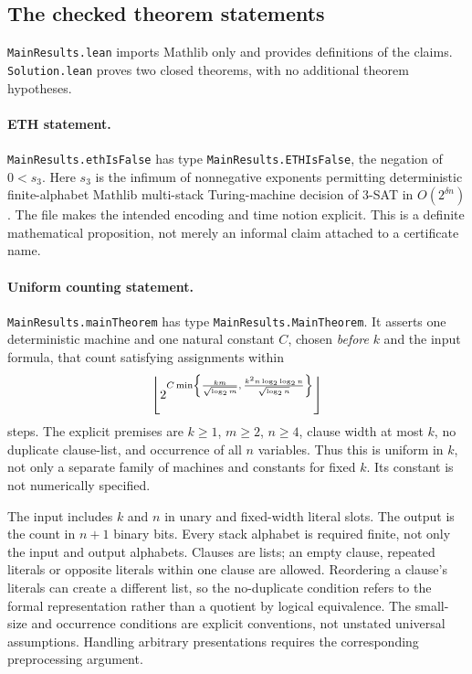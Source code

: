 \documentclass[11pt,letterpaper]{article}
\theoremstyle{remark}\newtheorem{remark}[theorem]{Remark}
\begin{document}
\subsection{The checked theorem statements}
\texttt{MainResults.lean} imports Mathlib only and provides definitions of the claims. \texttt{Solution.lean} proves two closed theorems, with no additional theorem hypotheses.

\paragraph{ETH statement.}
\texttt{MainResults.ethIsFalse} has type \texttt{MainResults.ETHIsFalse}, the negation of $0<s_3$. Here $s_3$ is the infimum of nonnegative exponents permitting deterministic finite-alphabet Mathlib multi-stack Turing-machine decision of 3-SAT in $O(2^{\delta n})$. The file makes the intended encoding and time notion explicit. This is a definite mathematical proposition, not merely an informal claim attached to a certificate name.

\paragraph{Uniform counting statement.}
\texttt{MainResults.mainTheorem} has type \texttt{MainResults.MainTheorem}. It asserts one deterministic machine and one natural constant $C$, chosen \emph{before} $k$ and the input formula, that count satisfying assignments within
\begin{equation}\label{eq:anthropic}
 \left\lfloor2^{C\min\left\{\frac{km}{\sqrt{\log_2m}},\,
        \frac{k^2n\log_2\log_2n}{\sqrt{\log_2n}}\right\}}\right\rfloor
\end{equation}
steps. The explicit premises are $k\ge1$, $m\ge2$, $n\ge4$, clause width at most $k$, no duplicate clause-list, and occurrence of all $n$ variables. Thus this is uniform in $k$, not only a separate family of machines and constants for fixed $k$. Its constant is not numerically specified. \cite{anthropicstatement}

The input includes $k$ and $n$ in unary and fixed-width literal slots. The output is the count in $n+1$ binary bits. Every stack alphabet is required finite, not only the input and output alphabets. Clauses are lists; an empty clause, repeated literals or opposite literals within one clause are allowed. Reordering a clause's literals can create a different list, so the no-duplicate condition refers to the formal representation rather than a quotient by logical equivalence. The small-size and occurrence conditions are explicit conventions, not unstated universal assumptions. Handling arbitrary presentations requires the corresponding preprocessing argument.
\end{document}
